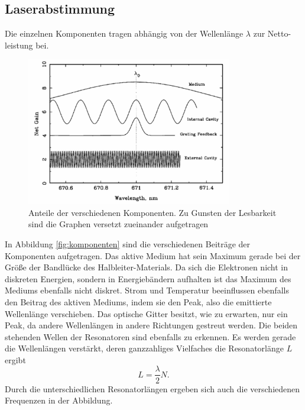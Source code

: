 \subsection{Laserabstimmung}
Die einzelnen Komponenten tragen abhängig von der Wellenlänge $\lambda$ zur Netto-leistung bei.
\begin{figure}[h]
    \centering
    \includegraphics[width=0.8\textwidth]{abb/Laserabstimmung.png}
    \caption{Anteile der verschiedenen Komponenten. Zu Gunsten der Lesbarkeit sind die Graphen versetzt zueinander aufgetragen \cite{laser}}
    \label{fig:komponenten}
\end{figure}
In Abbildung \eqref{fig:komponenten} sind die verschiedenen Beiträge der Komponenten aufgetragen.
Das aktive Medium hat sein Maximum gerade bei der Größe der Bandlücke des Halbleiter-Materials.
Da sich die Elektronen nicht in diskreten Energien,
sondern in Energiebändern aufhalten ist das Maximum des Mediums ebenfalls nicht diskret.
Strom und Temperatur beeinflussen ebenfalls den Beitrag des aktiven Mediums,
indem sie den Peak, also die emittierte Wellenlänge verschieben.
Das optische Gitter besitzt, 
wie zu erwarten,
nur ein Peak,
da andere Wellenlängen in andere Richtungen gestreut werden. 
Die beiden stehenden Wellen der Resonatoren sind ebenfalls zu erkennen.
Es werden gerade die Wellenlängen verstärkt,
deren ganzzahliges Vielfaches die Resonatorlänge $L$ ergibt
\begin{equation*}
    L = \frac{\lambda}{2}N.
\end{equation*} 
Durch die unterschiedlichen Resonatorlängen ergeben sich auch die verschiedenen Frequenzen in der Abbildung.

